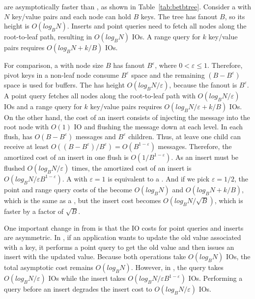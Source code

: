\bets are asymptotically faster than \btrees, as shown in
Table~\ref{tab:betbtree}.
Consider a \btree with $N$ key/value pairs and each node can hold $B$ keys.
The tree has fanout $B$, so its height is $O(log_{B}{N})$.
Inserts and point queries need to fetch all nodes along the root-to-leaf path,
resulting in $O(log_{B}{N})$ IOs.
A range query for $k$ key/value pairs requires $O(log_{B}{N} + k/B)$ IOs.

For comparison, a \bet with node size $B$ has fanout $B^{\varepsilon}$, where
$0 < \varepsilon \leq 1$.
Therefore, pivot keys in a non-leaf node consume $B^{\varepsilon}$ space and
the remaining $(B - B^{\varepsilon})$ space is used for buffers.
The \bet has height $O(log_{B}{N}/\varepsilon)$, because the fanout is
$B^{\varepsilon}$.
A point query fetches all nodes along the root-to-leaf path with
$O(log_{B}{N}/\varepsilon)$ IOs and a range query for $k$ key/value pairs
requires $O({log_{B}{N}}/{\varepsilon} + k/B)$ IOs.
On the other hand, the cost of an insert consists of injecting the message into
the root node with $O(1)$ IO and flushing the message down at each level.
In each flush, \bets has $O(B - B^{\varepsilon})$ messages and $B^{\varepsilon}$
children.
Thus, at leave one child can receive at least
$O((B - B^{\varepsilon})/B^{\varepsilon}) = O(B^{1 - \varepsilon})$ messages.
Therefore, the amortized cost of an insert in one flush is
$O(1/B^{1 - \varepsilon})$.
As an insert must be flushed $O(log_{B}{N}/\varepsilon)$ times, the amortized
cost of an insert is $O({log_{B}{N}}/{\varepsilon B^{1 - \varepsilon}})$.
A \bet with $\varepsilon = 1$ is equivalent to a \btree.
And if we pick $\varepsilon = 1/2$, the point and range query costs of the \bet
become $O(log_{B}{N})$ and $O(log_{B}{N} + k/B)$, which is the same as a \btree,
but the insert cost becomes $O(log_{B}{N}/{\sqrt{B}})$, which is faster by a
factor of $\sqrt{B}$.

One important change in \bets from \btrees is that the IO costs for point
queries and inserts are asymmetric.
In \btrees, if an application wants to update the old value associated with a
key, it performs a point query to get the old value and then issues an insert
with the updated value.
Because both operations take $O(log_{B}{N})$ IOs, the total asymptotic
cost remains $O(log_{B}{N})$.
However, in \bets, the query takes $O(log_{B}{N}/\varepsilon)$ IOs while the
insert takes $O({log_{B}{N}}/{\varepsilon B^{1 - \varepsilon}})$ IOs.
Performing a query before an insert degrades the insert cost to
$O(log_{B}{N}/\varepsilon)$ IOs.

